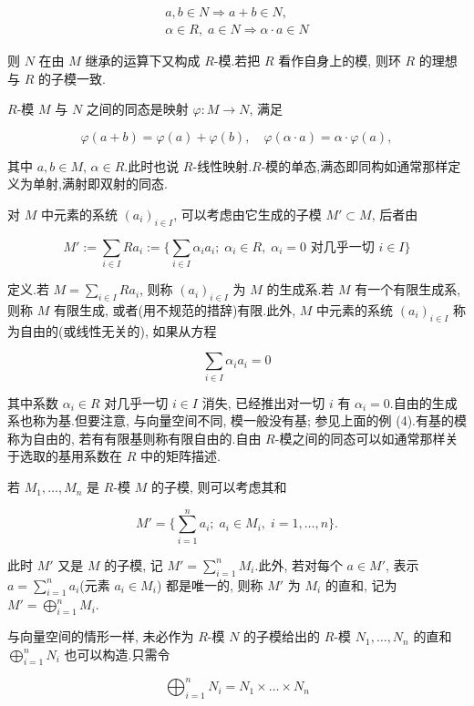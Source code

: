 \[
\begin{array}{c}
a, b \in N \Longrightarrow a + b \in N, \\
\alpha \in R, \; a \in N \Longrightarrow \alpha \cdot a \in N
\end{array}\]

则 $N$ 在由 $M$ 继承的运算下又构成 $R$-模.若把 $R$ 看作自身上的模, 则环 $R$ 的理想与 $R$ 的子模一致.

$R$-模 $M$ 与 $N$ 之间的同态是映射 $\varphi \colon M \longrightarrow N$, 满足

\[
\varphi(a + b) = \varphi(a) + \varphi(b), \quad \varphi(\alpha \cdot a) = \alpha \cdot \varphi(a),\]

其中 $a, b \in M$, $\alpha \in R$.此时也说 $R$-线性映射.$R$-模的单态,满态即同构如通常那样定义为单射,满射即双射的同态.

对 $M$ 中元素的系统 $(a_i)_{i \in I}$, 可以考虑由它生成的子模 $M' \subset M$, 后者由

\[
M' := \sum_{i \in I} R a_i := \Big\{\sum_{i \in I} \alpha_i a_i;\; \alpha_i \in R, \;\alpha_i = 0 \text{ 对几乎一切 } i \in I\Big\}\]

定义.若 $M = \sum_{i \in I} R a_i$, 则称 $(a_i)_{i \in I}$ 为 $M$ 的生成系.若 $M$ 有一个有限生成系, 则称 $M$ 有限生成, 或者(用不规范的措辞)有限.此外, $M$ 中元素的系统 $(a_i)_{i \in I}$ 称为自由的(或线性无关的), 如果从方程

\[
\sum_{i \in I} \alpha_i a_i = 0\]

其中系数 $\alpha_i \in R$ 对几乎一切 $i \in I$ 消失, 已经推出对一切 $i$ 有 $\alpha_i = 0$.自由的生成系也称为基.但要注意, 与向量空间不同, 模一般没有基; 参见上面的例 (4).有基的模称为自由的, 若有有限基则称有限自由的.自由 $R$-模之间的同态可以如通常那样关于选取的基用系数在 $R$ 中的矩阵描述.

若 $M_1, \ldots, M_n$ 是 $R$-模 $M$ 的子模, 则可以考虑其和

\[
M' = \Big\{\sum_{i = 1}^{n} a_i;\; a_i \in M_i, \; i = 1, \ldots, n\Big\}\text{.}\]

此时 $M'$ 又是 $M$ 的子模, 记 $M' = \sum_{i = 1}^{n} M_i$.此外, 若对每个 $a \in M'$, 表示 $a = \sum_{i = 1}^{n} a_i$(元素 $a_i \in M_i$) 都是唯一的, 则称 $M'$ 为 $M_i$ 的直和, 记为 $M' = \bigoplus_{i = 1}^{n} M_i$.

与向量空间的情形一样, 未必作为 $R$-模 $N$ 的子模给出的 $R$-模 $N_1, \ldots, N_n$ 的直和 $\bigoplus_{i = 1}^{n} N_i$ 也可以构造.只需令

\[
\bigoplus_{i = 1}^{n} N_i = N_1 \times \ldots \times N_n\]

